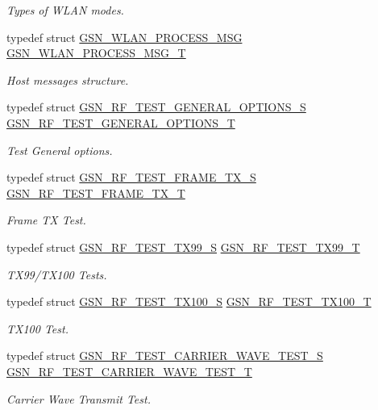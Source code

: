 \begin{DoxyCompactItemize}
\begin{DoxyCompactList}\small\item\em Types of WLAN modes. \end{DoxyCompactList}\item 
typedef struct \hyperlink{a00418}{GSN\_\-WLAN\_\-PROCESS\_\-MSG} \hyperlink{a00677_gaabf8bae549f7aca1d1a07fbc8f2d4459}{GSN\_\-WLAN\_\-PROCESS\_\-MSG\_\-T}
\begin{DoxyCompactList}\small\item\em Host messages structure. \end{DoxyCompactList}\item 
typedef struct \hyperlink{a00188}{GSN\_\-RF\_\-TEST\_\-GENERAL\_\-OPTIONS\_\-S} \hyperlink{a00677_gadc69ae2ca627931231f38c5a07778b9a}{GSN\_\-RF\_\-TEST\_\-GENERAL\_\-OPTIONS\_\-T}
\begin{DoxyCompactList}\small\item\em Test General options. \end{DoxyCompactList}\item 
typedef struct \hyperlink{a00187}{GSN\_\-RF\_\-TEST\_\-FRAME\_\-TX\_\-S} \hyperlink{a00677_ga054447e13e32b5fdf1ba941142c3b8b8}{GSN\_\-RF\_\-TEST\_\-FRAME\_\-TX\_\-T}
\begin{DoxyCompactList}\small\item\em Frame TX Test. \end{DoxyCompactList}\item 
typedef struct \hyperlink{a00190}{GSN\_\-RF\_\-TEST\_\-TX99\_\-S} \hyperlink{a00677_gad6f744cc56ee1d2eefa8b1b733cacbe5}{GSN\_\-RF\_\-TEST\_\-TX99\_\-T}
\begin{DoxyCompactList}\small\item\em TX99/TX100 Tests. \end{DoxyCompactList}\item 
typedef struct \hyperlink{a00189}{GSN\_\-RF\_\-TEST\_\-TX100\_\-S} \hyperlink{a00677_ga69f7ed019cbe7d83cfe2cc5446cdab1a}{GSN\_\-RF\_\-TEST\_\-TX100\_\-T}
\begin{DoxyCompactList}\small\item\em TX100 Test. \end{DoxyCompactList}\item 
typedef struct \hyperlink{a00185}{GSN\_\-RF\_\-TEST\_\-CARRIER\_\-WAVE\_\-TEST\_\-S} \hyperlink{a00677_gae9bb588f7933f628f82d3351844e18f8}{GSN\_\-RF\_\-TEST\_\-CARRIER\_\-WAVE\_\-TEST\_\-T}
\begin{DoxyCompactList}\small\item\em Carrier Wave Transmit Test. \end{DoxyCompactList}\item 

\end{DoxyCompactItemize}
